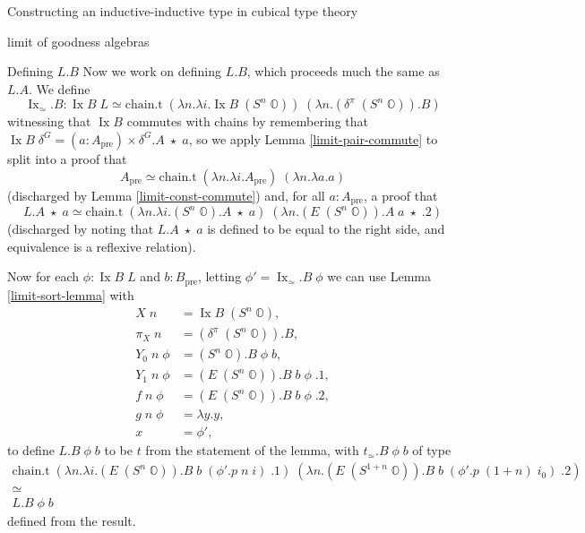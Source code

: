 \documentclass[acmsmall,review]{acmart}\settopmatter{printfolios=true,printccs=false,printacmref=false}
\DeclareMathOperator{\Ix}{Ix}
\newcommand{\pre}[1]{{#1}_\text{pre}}
\newcommand{\bbO}{\mathbb{O}}
\begin{document}
\begin{section}{Constructing an inductive-inductive type in cubical type theory}
\begin{subsection}{limit of goodness algebras}
\begin{subsubsection}{Defining $L.B$}
Now we work on defining $L.B$, which proceeds much the same as $L.A$.
We define \[\Ix_\simeq.B : \Ix B\;L \simeq \text{chain.t}\;(\lambda n.\lambda i.\Ix B\;(S^n\;\bbO))\;(\lambda n.(\delta^\pi\;(S^n\;\bbO)).B)\] witnessing that $\Ix B$ commutes with chains by remembering that $\Ix B\;\delta^G = (a : \pre{A}) \times \delta^G.A\;\star\;a$, so we apply Lemma \ref{limit-pair-commute} to split into a proof that \[\pre{A} \simeq \text{chain.t}\;(\lambda n.\lambda i. \pre{A})\;(\lambda n.\lambda a.a)\] (discharged by Lemma \ref{limit-const-commute}) and, for all $a : \pre{A}$, a proof that \[L.A\;\star\;a \simeq \text{chain.t}\;(\lambda n.\lambda i.(S^n\;\bbO).A\;\star\;a)\;(\lambda n.(E\;(S^n\;\bbO)).A\;a\;\star\;.2)\] (discharged by noting that $L.A\;\star\;a$ is defined to be equal to the right side, and equivalence is a reflexive relation).

Now for each $\phi : \Ix B\;L$ and $b : \pre{B}$, letting $\phi' = \Ix_\simeq.B\;\phi$ we can use Lemma \ref{limit-sort-lemma} with \begin{align*}
X\;n &= \Ix B\;(S^n\;\bbO),\\
\pi_X\;n &= (\delta^\pi\;(S^n\;\bbO)).B,\\
Y_0\;n\;\phi &= (S^n\;\bbO).B\;\phi\;b,\\
Y_1\;n\;\phi &= (E\;(S^n\;\bbO)).B\;b\;\phi\;.1,\\
f\;n\;\phi &= (E\;(S^n\;\bbO)).B\;b\;\phi\;.2,\\
g\;n\;\phi &= \lambda y.y,\\
x &= \phi',
\end{align*}
to define $L.B\;\phi\;b$ to be $t$ from the statement of the lemma, with $t_\simeq.B\;\phi\;b$ of type \begin{gather*}
\text{chain.t}\;(\lambda n.\lambda i.(E\;(S^n\;\bbO)).B\;b\;(\phi'.p\;n\;i)\;.1)\;(\lambda n.(E\;(S^{1+n}\;\bbO)).B\;b\;(\phi'.p\;(1+n)\;i_0)\;.2)\\\simeq\\L.B\;\phi\;b
\end{gather*} defined from the result.
\end{subsubsection}


\end{subsection}
\end{section}
\end{document}
